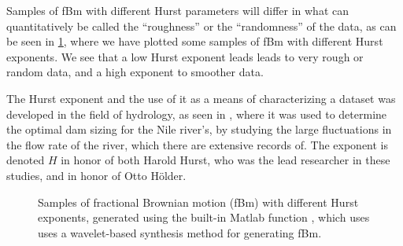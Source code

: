 Samples of fBm with different Hurst parameters will differ in what can quantitatively be called the ``roughness'' or the ``randomness'' of the data, as can be seen in \cref{fig:fBm_examples}, where we have plotted some samples of fBm with different Hurst exponents. We see that a low Hurst exponent leads leads to very rough or random data, and a high exponent to smoother data.


The Hurst exponent and the use of it as a means of characterizing a dataset was developed in the field of hydrology, as seen in \cite{hurst1951longterm,hurst1965longterm}, where it was used to determine the optimal dam sizing for the Nile river's, by studying the large fluctuations in the flow rate of the river, which there are extensive records of. The exponent is denoted $H$ in honor of both Harold Hurst, who was the lead researcher in these studies, and in honor of Otto H\"older.
%
%
\begin{figure}[htpb]%
    \centering%
    {%
        \newcommand{\sa}{H $\approx$ }%
    }%
    \caption{%
        Samples of fractional Brownian motion (fBm) with different Hurst exponents, generated using the built-in Matlab function , which uses uses a wavelet-based synthesis method\cite{abry1996wavelet} for generating fBm.%
    }%
    \label{fig:fBm_examples}%
\end{figure}%
